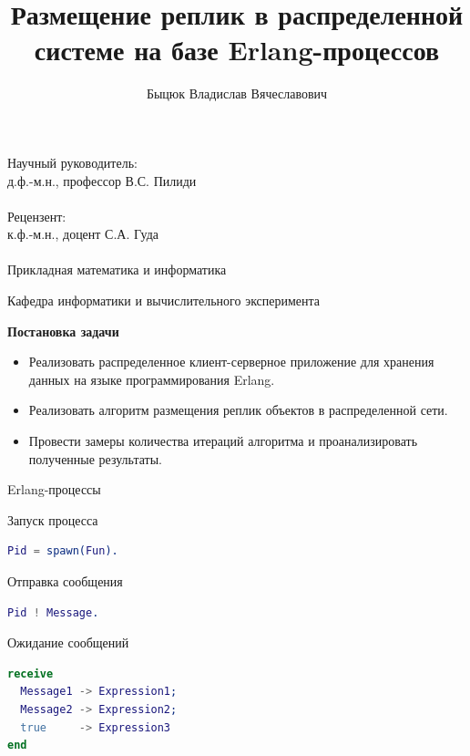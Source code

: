 \documentclass{beamer}
\title[]{Размещение реплик в распределенной\\системе на базе Erlang-процессов}
\author[Быцюк В.В.]{Быцюк Владислав Вячеславович}
\date[]{}
\begin{document}

\begin{frame}
	\titlepage
	\begin{center}
		Научный руководитель:\\д.ф.-м.н., профессор В.С. Пилиди\\~\\

		Рецензент:\\к.ф.-м.н., доцент С.А. Гуда\\~\\

		Прикладная математика и информатика

		Кафедра информатики и вычислительного эксперимента
	\end{center}
\end{frame}

\begin{frame}{\LARGE \textbf{Постановка задачи}}
	\begin{itemize}
		\item Реализовать распределенное клиент-серверное приложение для хранения данных на языке программирования Erlang. 
    	\item Реализовать алгоритм размещения реплик объектов в распределенной сети. 
    	\item Провести замеры количества итераций алгоритма и проанализировать полученные результаты.
	\end{itemize}
\end{frame}
	
	

\begin{frame}[fragile]{Erlang-процессы}
	\begin{block}{Запуск процесса}
		\begin{lstlisting}[language = erlang] 	
Pid = spawn(Fun).
		\end{lstlisting}
	\end{block}	

	\begin{block}{Отправка сообщения}
		\begin{lstlisting}[language = erlang] 	
Pid ! Message.
		\end{lstlisting}
	\end{block}	

	\begin{block}{Ожидание сообщений}
		\begin{lstlisting}[language = erlang] 	
receive
  Message1 -> Expression1;
  Message2 -> Expression2;
  true     -> Expression3
end
		\end{lstlisting}
	\end{block}	
\end{frame}
\end{document}
